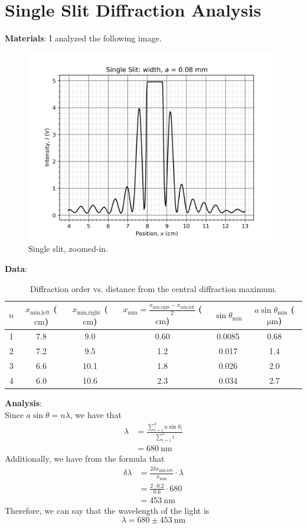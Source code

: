 \documentclass{article}
\begin{document}
\section{Single Slit Diffraction Analysis}
\textbf{Materials}: I analyzed the following image.
\begin{figure}[h!]
    \centering
    \includegraphics[width=0.4\linewidth]{../../ExtFiles/SingleSlitDiffraction.png}
    \caption{Single slit, zoomed-in.}
    \label{fig:singleSlitDiffraction}
\end{figure}\par
\textbf{Data}:
\begin{table}[h!]
    \centering
    \renewcommand{\arraystretch}{1.4}
    \begin{tabular}{|c|c|c|c|c|c|}
        \hline
        $n$ & $x_\text{min,left}$ ($\si{\centi\meter}$) & $x_\text{min,right}$ ($\si{\centi\meter}$) & $x_\text{min}=\frac{x_\text{min,right}-x_\text{min,left}}{2}$ ($\si{\centi\meter}$) & $\sin\theta_\text{min}$ & $a\sin\theta_\text{min}$ ($\si{\micro\meter}$)\\
        \hline
        1 & 7.8 & 9.0 & 0.60 & 0.0085 & 0.68\\
        \hline
        2 & 7.2 & 9.5 & 1.2 & 0.017 & 1.4\\
        \hline
        3 & 6.6 & 10.1 & 1.8 & 0.026 & 2.0\\
        \hline
        4 & 6.0 & 10.6 & 2.3 & 0.034 & 2.7\\
        \hline
    \end{tabular}
    \caption{Diffraction order vs. distance from the central diffraction maximum.}
    \label{fig:exp2data}
\end{table}\par
\textbf{Analysis}:\\
Since $a\sin\theta=n\lambda$, we have that
\begin{align*}
    \lambda &= \frac{\sum_{i=1}^4a\sin\theta_i}{\sum_{i=1}^4i}\\
    &= \SI{680}{\nano\meter}
\end{align*}
Additionally, we have from the formula that
\begin{align*}
    \delta\lambda &= \frac{2\delta x_\text{min,left}}{x_\text{min}}\cdot\lambda\\
    &= \frac{2\cdot 0.2}{0.6}\cdot 680\\
    &= \SI{453}{\nano\meter}
\end{align*}
Therefore, we can say that the wavelength of the light is
\begin{equation*}
    \lambda = 680\pm\SI{453}{\nano\meter}
\end{equation*}
\end{document}
